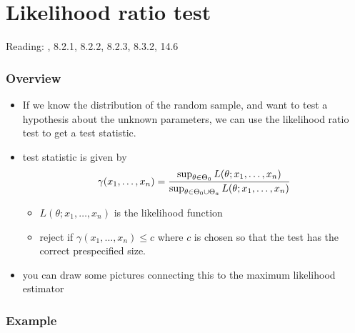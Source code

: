 

\part*{Likelihood ratio test}%

Reading: \citet{CaB_2001}, 8.2.1, 8.2.2, 8.2.3, 8.3.2,
\citet{Gre_2011} 14.6

\section{Overview}

\begin{itemize}
\item If we know the distribution of the random sample, and want to
      test a hypothesis about the unknown parameters, we can use the
      likelihood ratio test to get a test statistic.
\item test statistic is given by
      \[\gamma(x_1,\dots,x_n) = {\sup_{\theta \in \Theta_0} L(\theta;
      x_1,\dots,x_n) \over \sup_{\theta \in \Theta_0 \cup \Theta_a} L(\theta;
      x_1,\dots,x_n)}\]
\begin{itemize}
\item $L(\theta; x_1,\dots,x_n)$ is the likelihood function
\item reject if $\gamma(x_1,\dots,x_n) \leq c$ where $c$ is chosen
        so that the test has the correct prespecified size.
\end{itemize}
\item you can draw some pictures connecting this to the maximum
      likelihood estimator
\end{itemize}

\section{Example}

